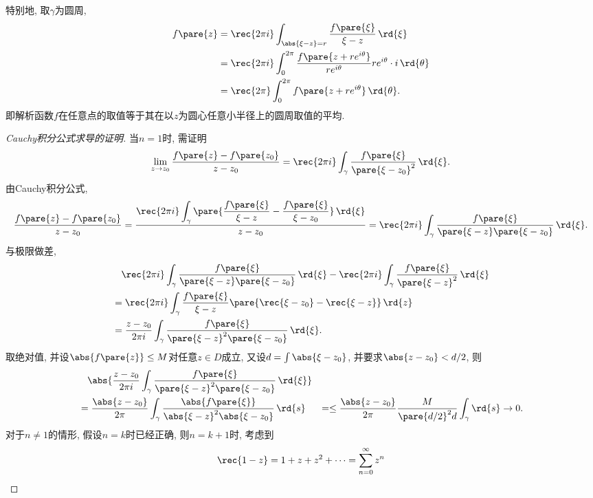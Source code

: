 \documentclass[../ComplexVariable.tex]{subfiles}
\begin{document}
\begin{remark}
    特别地, 取$\gamma$为圆周,
    \begin{align}
        f\pare{z} &= \rec{2\pi i} \int_{\abs{\xi - z} = r} \frac{f\pare{\xi}}{\xi - z}\,\rd{\xi} \\
        &= \rec{2\pi i} \int_0^{2\pi} \frac{f\pare{z+re^{i\theta}}}{re^{i\theta}}re^{i\theta}\cdot i\,\rd{\theta} \\
        \label{eq:点值作为平均值}
        &= \rec{2\pi} \int_0^{2\pi} f\pare{z+re^{i\theta}}\,\rd{\theta}.
    \end{align}
    即解析函数$f$在任意点的取值等于其在以$z$为圆心任意小半径上的圆周取值的平均.
\end{remark}
\begin{proof}[Cauchy积分公式求导的证明]
    当$n=1$时, 需证明
    \[ \lim_{z\rightarrow z_0} \frac{f\pare{z} - f\pare{z_0}}{z - z_0} = \rec{2\pi i} \int_\gamma \frac{f\pare{\xi}}{\pare{\xi - z_0}^2}\,\rd{\xi}. \]
    由Cauchy积分公式,
    \[ \frac{f\pare{z} - f\pare{z_0}}{z-z_0} = \frac{\displaystyle \rec{2\pi i}\int_\gamma \pare{\frac{f\pare{\xi}}{\xi - z} - \frac{f\pare{\xi}}{\xi - z_0}} \,\rd{\xi}}{z-z_0} = \rec{2\pi i} \int_\gamma \frac{f\pare{\xi}}{\pare{\xi - z}\pare{\xi - z_0}}\,\rd{\xi}. \]
    与极限做差,
    \begin{align*}
        &\phantom{=}\,\rec{2\pi i} \int_\gamma \frac{f\pare{\xi}}{\pare{\xi - z}\pare{\xi - z_0}}\,\rd{\xi} - \rec{2\pi i}\int_\gamma \frac{f\pare{\xi}}{\pare{\xi - z}^2}\,\rd{\xi}\\
        &= \rec{2\pi i} \int_\gamma \frac{f\pare{\xi}}{\xi - z} \pare{\rec{\xi - z_0} - \rec{\xi - z}}\,\rd{z} \\
        &= \frac{z - z_0}{2\pi i} \int_\gamma \frac{f\pare{\xi}}{\pare{\xi - z}^2\pare{\xi - z_0}}\,\rd{\xi}.
    \end{align*}
    取绝对值, 并设$\abs{f\pare{z}} \le M$对任意$z\in D$成立, 又设$d = \int \abs{\xi - z_0}$, 并要求$\abs{z-z_0}<d/2$, 则
    \begin{align*}
        & \phantom{=}\, \abs{\frac{z - z_0}{2\pi i} \int_\gamma \frac{f\pare{\xi}}{\pare{\xi - z}^2\pare{\xi - z_0}}\,\rd{\xi}} \\
        &= \frac{\abs{z-z_0}}{2\pi} \int_\gamma \frac{\abs{f\pare{\xi}}}{\abs{\xi - z}^2 \abs{\xi - z_0}}\,\rd{s}
        &= \le \frac{\abs{z-z_0}}{2\pi} \frac{M}{\pare{d/2}^2 d}\int_\gamma \rd{s} \rightarrow 0.
    \end{align*}
    对于$n\neq 1$的情形, 假设$n=k$时已经正确, 则$n=k+1$时, 考虑到
    \[ \rec{1-z} = 1+z+z^2+\cdots = \sum_{n=0}^\infty z^n \]

\end{proof}
\end{document}
